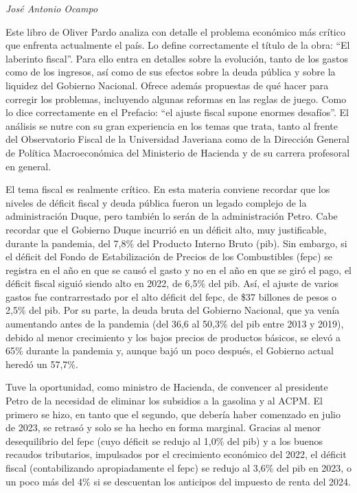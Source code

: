 \begin{prologo}

\begin{flushright}  %
\Large\textit{José Antonio Ocampo}
\end{flushright}

\vspace{1cm}

Este libro de Oliver Pardo analiza con detalle el problema económico más crítico que enfrenta actualmente el país. Lo define correctamente el título de la obra: ``El laberinto fiscal''. Para ello entra en detalles sobre la evolución, tanto de los gastos como de los ingresos, así como de sus efectos sobre la deuda pública y sobre la liquidez del Gobierno Nacional. Ofrece además propuestas de qué hacer para corregir los problemas, incluyendo algunas reformas en las reglas de juego. Como lo dice correctamente en el Prefacio: “el ajuste fiscal supone enormes desafíos”. El análisis se nutre con su gran experiencia en los temas que trata, tanto al frente del Observatorio Fiscal de la Universidad Javeriana como de la Dirección General de Política Macroeconómica del Ministerio de Hacienda y de su carrera profesoral en general.

El tema fiscal es realmente crítico. En esta materia conviene recordar que los niveles de déficit fiscal y deuda pública fueron un legado complejo de la administración Duque, pero también lo serán de la administración Petro. Cabe recordar que el Gobierno Duque incurrió en un déficit alto, muy justificable, durante la pandemia, del 7,8\% del Producto Interno Bruto (\gls{pib}). Sin embargo, si el déficit del Fondo de Estabilización de Precios de los Combustibles (\gls{fepc}) se registra en el año en que se causó el gasto y no en el año en que se giró el pago, el déficit fiscal siguió siendo alto en 2022, de 6,5\% del \gls{pib}. Así, el ajuste de varios gastos fue contrarrestado por el alto déficit del \gls{fepc}, de \$37 billones de pesos o 2,5\% del \gls{pib}. Por su parte, la deuda bruta del Gobierno Nacional, que ya venía aumentando antes de la pandemia (del 36,6 al 50,3\% del \gls{pib} entre 2013 y 2019), debido al menor crecimiento y los bajos precios de productos básicos, se elevó a 65\% durante la pandemia y, aunque bajó un poco después, el Gobierno actual heredó un 57,7\%.

Tuve la oportunidad, como ministro de Hacienda, de convencer al presidente Petro de la necesidad de eliminar los subsidios a la gasolina y al ACPM. El primero se hizo, en tanto que el segundo, que debería haber comenzado en julio de 2023, se retrasó y solo se ha hecho en forma marginal. Gracias al menor desequilibrio del \gls{fepc} (cuyo déficit se redujo al 1,0\% del \gls{pib}) y a los buenos recaudos tributarios, impulsados por el crecimiento económico del 2022, el déficit fiscal (contabilizando apropiadamente el \gls{fepc}) se redujo al 3,6\% del \gls{pib} en 2023, o un poco más del 4\% si se descuentan los anticipos del impuesto de renta del 2024.


\end{prologo}
